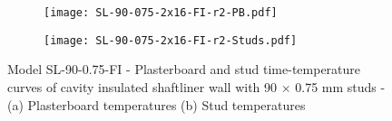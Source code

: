\begin{figure}[!htbp]
	\centering
	\begin{subfigure}[b]{0.6\textwidth}
		\centering
		\texttt{[image: SL-90-075-2x16-FI-r2-PB.pdf]}
		\caption{}
		\label{subfig:SL-90-075-2x16-FI-r2-PB}
	\end{subfigure}
	\begin{subfigure}[b]{0.6\textwidth}
		\centering
		\texttt{[image: SL-90-075-2x16-FI-r2-Studs.pdf]}
		\caption{}
		\label{subfig:SL-90-075-2x16-FI-r2-Studs}
	\end{subfigure}
	   \caption{Model SL-90-0.75-FI - Plasterboard and stud time-temperature curves of cavity insulated shaftliner wall with 90 $\times$ 0.75 mm studs - (a) Plasterboard temperatures (b) Stud temperatures}
	   \label{fig:SL-90-075-2x16-FI-r2}
\end{figure}


